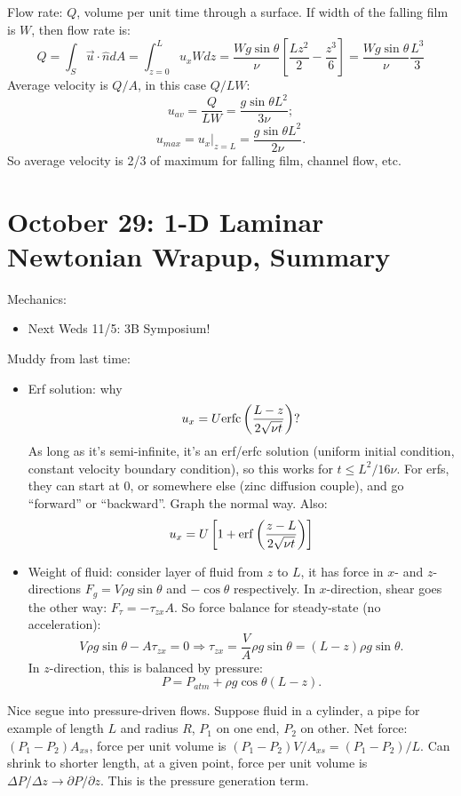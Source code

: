 \documentclass{report}
\begin{document}
Flow rate: $Q$, volume per unit time through a surface.  If width of the
falling film is $W$, then flow rate is:
$$Q=\int_S \vec{u}\cdot\hat{n}dA = \int_{z=0}^L u_x W dz =
\frac{Wg\sin\theta}{\nu}\left[\frac{Lz^2}{2}-\frac{z^3}{6}\right] =
\frac{Wg\sin\theta}{\nu}\frac{L^3}{3}$$
Average velocity is $Q/A$, in this case $Q/LW$:
$$u_{av} = \frac{Q}{LW} = \frac{g\sin\theta L^2}{3\nu};$$
$$u_{max} = \left.u_x\right|_{z=L} = \frac{g\sin\theta L^2}{2\nu}.$$
So average velocity is 2/3 of maximum for falling film, channel flow, etc.
\newpage


\section{October 29: 1-D Laminar Newtonian Wrapup, Summary}

Mechanics:
\begin{itemize}
\item Next Weds 11/5: 3B Symposium!
\end{itemize}

\noindent Muddy from last time:
\begin{itemize}
\item Erf solution: why
  $$u_x=U{\rm erfc}\left(\frac{L-z}{2\sqrt{\nu t}}\right)?$$
  As long as it's semi-infinite, it's an erf/erfc solution (uniform initial
  condition, constant velocity boundary condition), so this works for $t\leq
  L^2/16\nu$.  For erfs, they can start at 0, or somewhere else (zinc diffusion
  couple), and go ``forward'' or ``backward''.  Graph the normal way.  Also:
  $$u_x = U\left[1+{\rm erf}\left(\frac{z-L}{2\sqrt{\nu t}}\right)\right]$$
\item Weight of fluid: consider layer of fluid from $z$ to $L$, it has force in
  $x$- and $z$-directions $F_g=V\rho g\sin\theta$ and $-\cos\theta$
  respectively.  In $x$-direction, shear goes the other way: $F_\tau =
  -\tau_{zx}A$.  So force balance for steady-state (no acceleration):
  $$V\rho g\sin\theta - A\tau_{zx} = 0 \Rightarrow \tau_{zx}= \frac{V}{A} \rho
  g\sin\theta = (L-z) \rho g\sin\theta.$$
  In $z$-direction, this is balanced by pressure:
  $$P = P_{atm} + \rho g\cos\theta(L-z).$$
\end{itemize}

Nice segue into pressure-driven flows.  Suppose fluid in a cylinder, a pipe for
example of length $L$ and radius $R$, $P_1$ on one end, $P_2$ on other.  Net
force: $(P_1-P_2)A_{xs}$, force per unit volume is $(P_1-P_2)V/A_{xs} =
(P_1-P_2)/L$.  Can shrink to shorter length, at a given point, force per unit
volume is $\Delta P/\Delta z\rightarrow\partial P/\partial z$.  This is the
pressure generation term.
\end{document}
